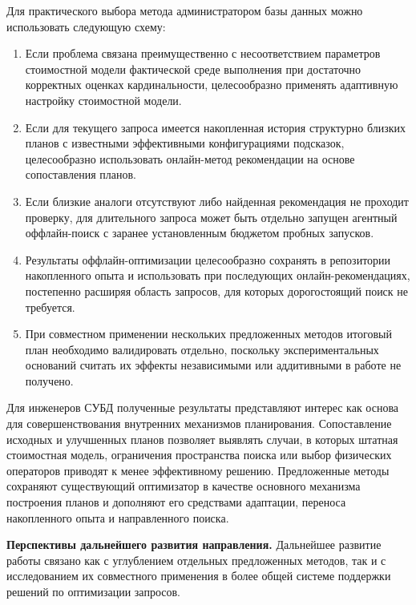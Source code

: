 Для практического выбора метода администратором базы данных можно использовать следующую схему:
\begin{enumerate}
    \item Если проблема связана преимущественно с несоответствием параметров стоимостной модели фактической среде выполнения при достаточно корректных оценках кардинальности, целесообразно применять адаптивную настройку стоимостной модели.
    \item Если для текущего запроса имеется накопленная история структурно близких планов с известными эффективными конфигурациями подсказок, целесообразно использовать онлайн-метод рекомендации на основе сопоставления планов.
    \item Если близкие аналоги отсутствуют либо найденная рекомендация не проходит проверку, для длительного запроса может быть отдельно запущен агентный оффлайн-поиск с заранее установленным бюджетом пробных запусков.
    \item Результаты оффлайн-оптимизации целесообразно сохранять в репозитории накопленного опыта и использовать при последующих онлайн-рекомендациях, постепенно расширяя область запросов, для которых дорогостоящий поиск не требуется.
    \item При совместном применении нескольких предложенных методов итоговый план необходимо валидировать отдельно, поскольку экспериментальных оснований считать их эффекты независимыми или аддитивными в работе не получено.
\end{enumerate}

Для инженеров СУБД полученные результаты представляют интерес как основа для совершенствования внутренних механизмов планирования. Сопоставление исходных и улучшенных планов позволяет выявлять случаи, в которых штатная стоимостная модель, ограничения пространства поиска или выбор физических операторов приводят к менее эффективному решению. Предложенные методы сохраняют существующий оптимизатор в качестве основного механизма построения планов и дополняют его средствами адаптации, переноса накопленного опыта и направленного поиска.


\medskip
\noindent
\textbf{Перспективы дальнейшего развития направления.}
Дальнейшее развитие работы связано как с углублением отдельных предложенных методов, так и с исследованием их совместного применения в более общей системе поддержки решений по оптимизации запросов.

